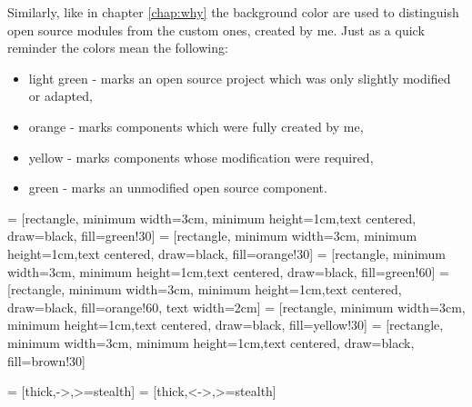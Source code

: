 Similarly, like in chapter \ref{chap:why} the background color are used to distinguish open source modules from the custom ones, created by me. Just as a quick reminder the colors mean the following:
\begin{itemize}
    \item \colorbox{green!30}{light green} - marks an open source project which was only slightly modified or adapted,
    \item \colorbox{orange!30}{orange} - marks components which were fully created by me,
    \item \colorbox{yellow!30}{yellow} - marks components whose modification were required,
    \item \colorbox{green!60}{green} - marks an unmodified open source component.
\end{itemize}


 = [rectangle, minimum width=3cm, minimum height=1cm,text centered, draw=black, fill=green!30]
 = [rectangle, minimum width=3cm, minimum height=1cm,text centered, draw=black, fill=orange!30]
 = [rectangle, minimum width=3cm, minimum height=1cm,text centered, draw=black, fill=green!60]
 = [rectangle, minimum width=3cm, minimum height=1cm,text centered, draw=black, fill=orange!60, text width=2cm]
 = [rectangle, minimum width=3cm, minimum height=1cm,text centered, draw=black, fill=yellow!30]
 = [rectangle, minimum width=3cm, minimum height=1cm,text centered, draw=black, fill=brown!30]

 = [thick,->,>=stealth]
 = [thick,<->,>=stealth]

